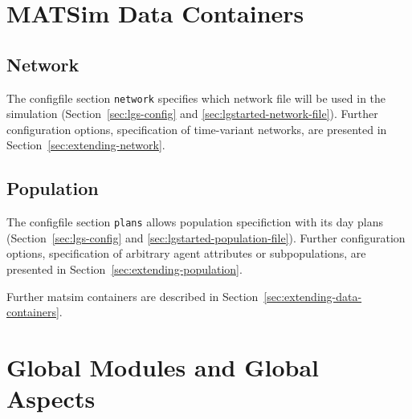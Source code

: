 \section{MATSim Data Containers}
\label{sec:using-data-containers}

\subsection{Network}
\label{sec:using-network}
The \gls{configfile} section \lstinline|network|
specifies which network file will be used in the simulation (Section~\ref{sec:lgs-config} and \ref{sec:lgstarted-network-file}). Further configuration options, \eg specification of time-variant networks, are presented in Section~\ref{sec:extending-network}.

\subsection{Population}
\label{sec:using-population}
The \gls{configfile} section \lstinline|plans| allows population specifiction with its day plans (Section~\ref{sec:lgs-config} and \ref{sec:lgstarted-population-file}). Further configuration options, \eg specification of arbitrary agent attributes or subpopulations, are presented in Section~\ref{sec:extending-population}.

Further \gls{matsim} containers are described in Section~\ref{sec:extending-data-containers}.

\section{Global Modules and Global Aspects}
\label{sec:using-globalmodules}
